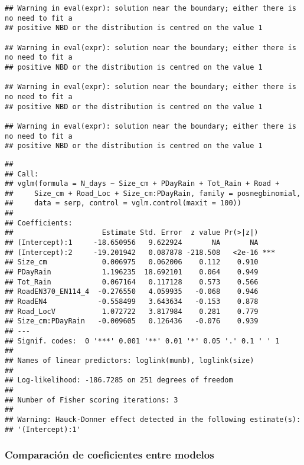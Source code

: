 \documentclass[
]{book}
\newenvironment{Shaded}{\begin{snugshade}}{\end{snugshade}}
\newcommand{\DataTypeTok}[1]{\textcolor[rgb]{0.13,0.29,0.53}{#1}}
\newcommand{\DecValTok}[1]{\textcolor[rgb]{0.00,0.00,0.81}{#1}}
\newcommand{\KeywordTok}[1]{\textcolor[rgb]{0.13,0.29,0.53}{\textbf{#1}}}
\newcommand{\NormalTok}[1]{#1}
\newcommand{\OperatorTok}[1]{\textcolor[rgb]{0.81,0.36,0.00}{\textbf{#1}}}
\begin{document}
\begin{verbatim}
## Warning in eval(expr): solution near the boundary; either there is no need to fit a
## positive NBD or the distribution is centred on the value 1

## Warning in eval(expr): solution near the boundary; either there is no need to fit a
## positive NBD or the distribution is centred on the value 1

## Warning in eval(expr): solution near the boundary; either there is no need to fit a
## positive NBD or the distribution is centred on the value 1

## Warning in eval(expr): solution near the boundary; either there is no need to fit a
## positive NBD or the distribution is centred on the value 1
\end{verbatim}

\begin{verbatim}
## 
## Call:
## vglm(formula = N_days ~ Size_cm + PDayRain + Tot_Rain + Road + 
##     Size_cm + Road_Loc + Size_cm:PDayRain, family = posnegbinomial, 
##     data = serp, control = vglm.control(maxit = 100))
## 
## Coefficients: 
##                     Estimate Std. Error  z value Pr(>|z|)    
## (Intercept):1     -18.650956   9.622924       NA       NA    
## (Intercept):2     -19.201942   0.087878 -218.508   <2e-16 ***
## Size_cm             0.006975   0.062006    0.112    0.910    
## PDayRain            1.196235  18.692101    0.064    0.949    
## Tot_Rain            0.067164   0.117128    0.573    0.566    
## RoadEN370_EN114_4  -0.276550   4.059935   -0.068    0.946    
## RoadEN4            -0.558499   3.643634   -0.153    0.878    
## Road_LocV           1.072722   3.817984    0.281    0.779    
## Size_cm:PDayRain   -0.009605   0.126436   -0.076    0.939    
## ---
## Signif. codes:  0 '***' 0.001 '**' 0.01 '*' 0.05 '.' 0.1 ' ' 1
## 
## Names of linear predictors: loglink(munb), loglink(size)
## 
## Log-likelihood: -186.7285 on 251 degrees of freedom
## 
## Number of Fisher scoring iterations: 3 
## 
## Warning: Hauck-Donner effect detected in the following estimate(s):
## '(Intercept):1'
\end{verbatim}

\hypertarget{comparaciuxf3n-de-coeficientes-entre-modelos}{%
\subsubsection{Comparación de coeficientes entre modelos}\label{comparaciuxf3n-de-coeficientes-entre-modelos}}

\begin{Shaded}
\end{Shaded}
\end{document}
